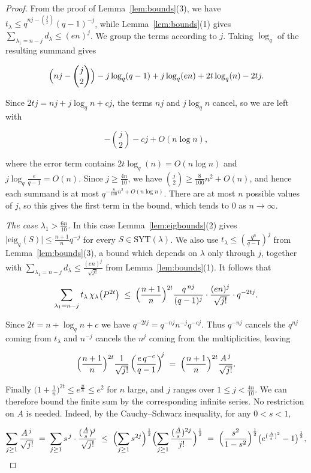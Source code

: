 \documentclass[11pt]{article}
\theoremstyle{plain}  %
\newcommand{\eig}{\text{eig}} %
\begin{document}
\begin{proof}
From the proof of Lemma~\ref{lem:bounds}(3), we have
$t_\lambda \le q^{nj-\binom{j}{2}}(q-1)^{-j}$, while
Lemma~\ref{lem:bounds}(1) gives
$\sum_{\lambda_1=n-j} d_\lambda \le (en)^{j}$. We group the terms according to
$j$. Taking $\log_q$ of the resulting summand gives

$$
  \Bigl(nj-\binom{j}{2}\Bigr) - j\log_q(q-1) + j\log_q(en) + 2t\log_q(n) - 2tj .
$$

Since $2tj = nj + j\log_q n + cj$, the terms $nj$ and $j\log_q n$ cancel, so
we are left with

$$
  -\binom{j}{2} - cj + O(n\log n),
$$

where the error term contains $2t\log_q(n) = O(n\log n)$ and
$j\log_q\frac{e}{q-1} = O(n)$. Since $j \ge \frac{4n}{10}$, we have
$\binom{j}{2} \ge \frac{8}{100}n^{2}+O(n)$, and hence each summand is at most
$q^{-\frac{8}{100}n^{2}+O(n\log n)}$. There are at most $n$ possible values of
$j$, so this gives the first term in the bound, which tends to $0$ as
$n \to \infty$.

\emph{The case $\lambda_1 > \frac{6n}{10}$.} In this case
Lemma~\ref{lem:eigbounds}(2) gives
$\bigl|\eig_q(S)\bigr| \le \frac{n+1}{n}q^{-j}$ for every
$S \in \mathrm{SYT}(\lambda)$. We also use
$t_\lambda \le (\frac{q^{n}}{q-1})^{j}$ from Lemma~\ref{lem:bounds}(3), a bound
which depends on $\lambda$ only through $j$, together with
$\sum_{\lambda_1=n-j} d_\lambda \le \frac{(en)^{j}}{\sqrt{j!}}$ from
Lemma~\ref{lem:bounds}(1). It follows that

$$
  \sum_{\substack{\lambda_1 = n-j}}
  t_\lambda\,\chi_\lambda\bigl(P^{2t}\bigr)
  \;\le\;
  \Bigl(\frac{n+1}{n}\Bigr)^{2t}
  \frac{q^{\,nj}}{(q-1)^{j}}\cdot\frac{(en)^{j}}{\sqrt{j!}}\cdot q^{-2tj}.
$$

Since $2t = n+\log_q n + c$ we have $q^{-2tj} = q^{-nj}n^{-j}q^{-cj}$.
Thus $q^{-nj}$ cancels the $q^{nj}$ coming from $t_\lambda$ and $n^{-j}$
cancels the $n^{j}$ coming from the multiplicities, leaving

$$
  \Bigl(\frac{n+1}{n}\Bigr)^{2t}\frac{1}{\sqrt{j!}}
  \left(\frac{e\,q^{-c}}{q-1}\right)^{\!j}
  \;=\;
  \Bigl(\frac{n+1}{n}\Bigr)^{2t}\frac{A^{\,j}}{\sqrt{j!}} .
$$

Finally $\bigl(1+\frac1n\bigr)^{2t}\le e^{\frac{2t}{n}}\le e^{2}$ for $n$ large, and
$j$ ranges over $1 \le j < \frac{4n}{10}$. We can therefore bound the finite
sum by the corresponding infinite series. No restriction on $A$ is needed.
Indeed, by the Cauchy--Schwarz inequality, for any $0<s<1$,

$$
  \sum_{j\ge1}\frac{A^{\,j}}{\sqrt{j!}}
  \;=\; \sum_{j\ge1} s^{\,j}\cdot\frac{(\frac{A}{s})^{j}}{\sqrt{j!}}
  \;\le\; \Bigl(\sum_{j\ge1}s^{2j}\Bigr)^{\frac{1}{2}}
           \Bigl(\sum_{j\ge1}\frac{(\frac{A}{s})^{2j}}{j!}\Bigr)^{\frac{1}{2}}
  \;=\; \Bigl(\frac{s^{2}}{1-s^{2}}\Bigr)^{\frac{1}{2}}
        \bigl(e^{(\frac{A}{s})^2}-1\bigr)^{\frac{1}{2}},
$$


\end{proof}
\end{document}
